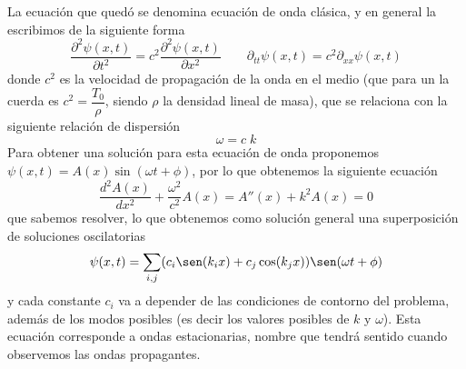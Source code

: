 \documentclass[a4paper,spanish]{article}
\numberwithin{equation}{section}
\begin{document}
			La ecuaci\'on que qued\'o se denomina ecuaci\'on de onda cl\'asica, y en general la escribimos de la siguiente forma
			\begin{equation}
				\frac{\partial^2 \psi(x,t)}{\partial t^2} = c^2 \frac{\partial^2 \psi(x,t)}{\partial x^2} \qquad \partial_{tt} \psi(x,t) = c^2 \partial_{xx} \psi(x,t)
				\label{eq:ondas_ecuacion}
			\end{equation}
			donde $c^2$ es la velocidad de propagaci\'on de la onda en el medio (que para un la cuerda es $c^2 = \dfrac{T_0}{\rho}$, siendo $\rho$ la densidad lineal de masa), que se relaciona con la siguiente relaci\'on de dispersi\'on
			\begin{equation}
				\omega = c\;k
				\label{eq:onda_dispersion}
			\end{equation}
			Para obtener una soluci\'on para esta ecuaci\'on de onda proponemos $\psi(x,t) = A(x) \sin(\omega t + \phi)$, por lo que obtenemos la siguiente ecuaci\'on
			\begin{equation*}
				\frac{d^2 A(x)}{d x^2} + \frac{\omega^2}{c^2} A(x) = A''(x) + k^2 A(x) = 0
			\end{equation*}
			que sabemos resolver, lo que obtenemos como soluci\'on general una superposici\'on de soluciones oscilatorias
			\begin{equation}
				\psi(x,t) = \sum_{i,j} (c_i \sen(k_i x) + c_j \cos(k_j x)) \sen(\omega t + \phi)
				\label{eq:onda_solucion}
			\end{equation}
			y cada constante $c_i$ va a depender de las condiciones de contorno del problema, adem\'as de los modos posibles (es decir los valores posibles de $k$ y $\omega$). Esta ecuaci\'on corresponde a ondas estacionarias, nombre que tendr\'a sentido cuando observemos las ondas propagantes.
			
\end{document}
